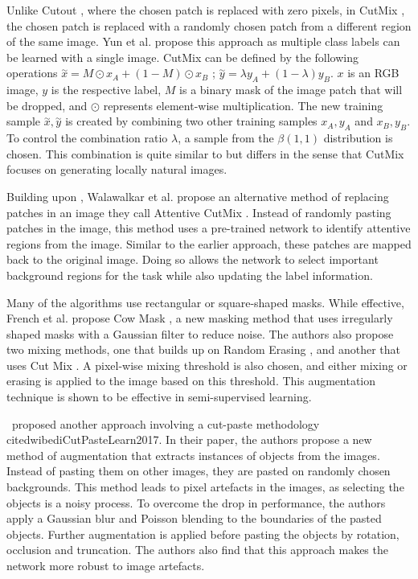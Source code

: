 Unlike Cutout \cite{devriesImprovedRegularizationConvolutional2017}, where the chosen patch is replaced with zero pixels, in CutMix \cite{yunCutMixRegularizationStrategy2019}, the chosen patch is replaced with a randomly chosen patch from a different region of the same image. Yun et al. propose this approach as multiple class labels can be learned with a single image.
CutMix can be defined by the following operations $\overset{\sim}x = M \odot x_{A} + (1-M) \odot x_{B}$ ; $\overset{\sim}y = \lambda y_{A}+ (1- \lambda)y_{B}$. $x$ is an RGB image, $y$ is the respective label, $M$ is a binary mask of the image patch that will be dropped, and $\odot$ represents element-wise multiplication. The new training sample $\overset{\sim}x , \overset{\sim}y$ is created by combining two other training samples $x_{A}, y_{A}$ and $x_{B} , y_{B}$. To control the combination ratio $\lambda$, a sample from the $\beta(1,1)$ distribution is chosen. This combination is quite similar to \cite{zhangMixupEmpiricalRisk2018} but differs in the sense that CutMix focuses on generating locally natural images.

Building upon \cite{yunCutMixRegularizationStrategy2019}, Walawalkar et al. propose an alternative method of replacing patches in an image they call Attentive CutMix \cite{walawalkarAttentiveCutMixEnhanced2020}. Instead of randomly pasting patches in the image, this method uses a pre-trained network to identify attentive regions from the image. Similar to the earlier approach, these patches are mapped back to the original image. Doing so allows the network to select important background regions for the task while also updating the label information.

Many of the algorithms use rectangular or square-shaped masks. While effective, French et al. propose Cow Mask \cite{frenchMilkingCowMaskSemiSupervised2020}, a new masking method that uses irregularly shaped masks with a Gaussian filter to reduce noise. The authors also propose two mixing methods, one that builds up on Random Erasing \cite{zhongRandomErasingData2020}, and another that uses Cut Mix \cite{yunCutMixRegularizationStrategy2019}. A pixel-wise mixing threshold is also chosen, and either mixing or erasing is applied to the image based on this threshold. This augmentation technique is shown to be effective in semi-supervised learning.

\ proposed another approach involving a cut-paste methodology cite{dwibediCutPasteLearn2017}. In their paper, the authors propose a new method of augmentation that extracts instances of objects from the images. Instead of pasting them on other images, they are pasted on randomly chosen backgrounds. This method leads to pixel artefacts in the images, as selecting the objects is a noisy process. To overcome the drop in performance, the authors apply a Gaussian blur and Poisson blending to the boundaries of the pasted objects. Further augmentation is applied before pasting the objects by rotation, occlusion and truncation. The authors also find that this approach makes the network more robust to image artefacts.

